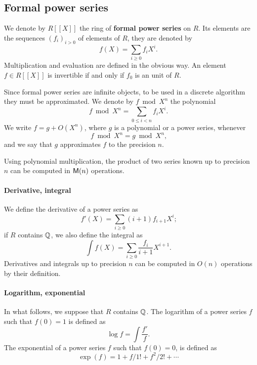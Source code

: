 \subsection{Formal power series}
\label{sec:formal-power-series}
We denote by $R[[X]]$ the ring of
\textbf{formal power series} on $R$. Its
elements are the sequences $(f_i)_{i>0}$ of elements of $R$, they are
denoted by
\begin{equation}
  \label{eq:197}
  f(X) = \sum_{i\ge0}f_iX^i
  \text{.}
\end{equation}
Multiplication and evaluation are defined in the obvious way. An
element $f\in R[[X]]$ is invertible if and only if $f_0$ is an unit
of $R$.

Since formal power series are infinite objects, to be used in a
discrete algorithm they must be approximated. We denote by $f\bmod
X^n$ the polynomial
\begin{equation}
  \label{eq:198}
  f\bmod X^n = \sum_{0\le i < n}f_iX^i
  \text{.}
\end{equation}
We write $f = g + O(X^n)$, where $g$ is a polynomial or a power
series, whenever
\[f\bmod X^n=g\bmod X^n\text{,}\] and we say that $g$ approximates $f$
to the precision $n$.

Using polynomial multiplication, the product of two series known up to
precision $n$ can be computed in $\mathsf{M}(n)$ operations.

\paragraph{Derivative, integral}
\label{sec:derivative-integral}
We define the derivative of a
power series as
\begin{equation}
  f'(X) = \sum_{i\ge0}(i+1)f_{i+1}X^i\text{;}
\end{equation}
if $R$ contains $\mathbb{Q}$, we also define the
integral as
\begin{equation}
  \label{eq:200}
  \int f(X) = \sum_{i\ge0}\frac{f_i}{i+1}X^{i+1}\text{.}
\end{equation}
Derivatives and integrals up to precision $n$ can be computed in
$O(n)$ operations by their definition.

\paragraph{Logarithm, exponential}
\label{sec:logarithm}
In what follows, we suppose that $R$ contains $\mathbb{Q}$. The
logarithm of a power series $f$
such that $f(0)=1$ is defined as
\begin{equation}
  \label{eq:194}
  \log f = \int\frac{f'}{f}
  \text{.}
\end{equation}
The exponential of a power
series $f$ such that $f(0)=0$, is defined as
\begin{equation}
  \label{eq:195}
  \exp(f) = 1 + f/1! + f^2/2! + \cdots
\end{equation}

